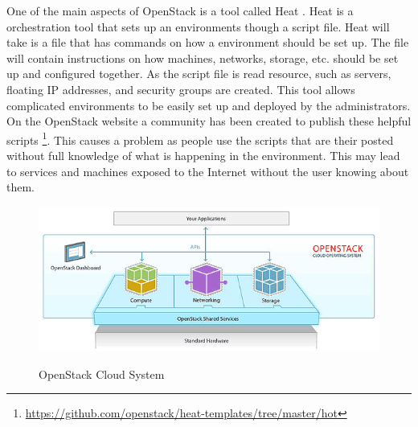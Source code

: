 \documentclass[12pt]{article}
\begin{document}
One of the main aspects of OpenStack is a tool called Heat \cite{HeatOS}. Heat is a orchestration tool that sets up an environments though a script file. Heat will take is a file that has commands on how a environment should be set up. The file will contain instructions on how machines, networks, storage, etc. should be set up and configured together. As the script file is read resource, such as servers, floating IP addresses, and security groups are created. This tool allows complicated environments to be easily set up and deployed by the administrators. On the OpenStack website a community has been created to publish these helpful scripts \footnote{\href{https://github.com/openstack/heat-templates/tree/master/hot}{https://github.com/openstack/heat-templates/tree/master/hot}}. This causes a problem as people use the scripts that are their posted without full knowledge of what is happening in the environment. This may lead to services and machines exposed to the Internet without the user knowing about them.
\begin{figure}[H]
    \centering
    \includegraphics[scale=.6]{./pic/openstack-sm.png}
    \label{fig:OpenStack}
    \caption{OpenStack Cloud System}
\end{figure}
\end{document}

